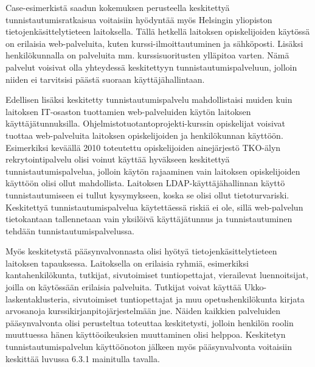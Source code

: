 Case-esimerkistä saadun kokemuksen perusteella keskitettyä tunnistautumisratkaisua voitaisiin hyödyntää myös Helsingin yliopiston tietojenkäsittelytieteen laitoksella. Tällä hetkellä laitoksen opiskelijoiden käytössä on erilaisia web-palveluita, kuten kurssi-ilmoittautuminen ja sähköposti. Lisäksi henkilökunnalla on palveluita mm. kurssisuoritusten ylläpitoa varten. Nämä palvelut voisivat olla yhteydessä keskitettyyn tunnistautumispalveluun, jolloin niiden ei tarvitsisi päästä suoraan käyttäjähallintaan.

Edellisen lisäksi keskitetty tunnistautumispalvelu mahdollistaisi muiden kuin laitoksen IT-osaston tuottamien web-palveluiden käytön laitoksen käyttäjätunnuksilla. Ohjelmistotuotantoprojekti-kurssin opiskelijat voisivat tuottaa web-palveluita laitoksen opiskelijoiden ja henkilökunnan käyttöön. Esimerkiksi keväällä 2010 toteutettu opiskelijoiden ainejärjestö TKO-älyn rekrytointipalvelu olisi voinut käyttää hyväkseen keskitettyä tunnistautumispalvelua, jolloin käytön rajaaminen vain laitoksen opiskelijoiden käyttöön olisi ollut mahdollista. Laitoksen LDAP-käyt\-tä\-jä\-hal\-lin\-nan käyttö tunnistautumiseen ei tullut kysymykseen, koska se olisi ollut tietoturvariski. Keskitettyä tunnistautumispalvelua käytettäessä riskiä ei ole, sillä web-palvelun tietokantaan tallennetaan vain yksilöivä käyttäjätunnus ja tunnistautuminen tehdään tunnistautumispalvelussa.

Myös keskitetystä pääsynvalvonnasta olisi hyötyä tietojenkäsittelytieteen laitoksen tapauksessa. Laitoksella on erilaisia ryhmiä, esimerkiksi kantahenkilökunta, tutkijat, sivutoimiset tuntiopettajat, vierailevat luennoitsijat, joilla on käytössään erilaisia palveluita. Tutkijat voivat käyttää Ukko-laskentaklusteria, sivutoimiset tuntiopettajat ja muu opetushenkilökunta kirjata arvosanoja kurssikirjanpitojärjestelmään jne. Näiden kaikkien palveluiden pääsynvalvonta olisi perusteltua toteuttaa keskitetysti, jolloin henkilön roolin muuttuessa hänen käyttöoikeuksien muuttaminen olisi helppoa. Keskitetyn tunnistautumispalvelun käyttöönoton jälkeen myös pääsynvalvonta voitaisiin keskittää luvussa 6.3.1 mainitulla tavalla.